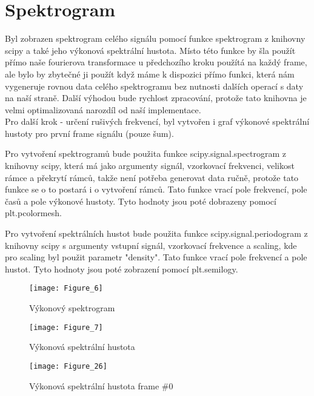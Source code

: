 \section{Spektrogram}

Byl zobrazen spektrogram celého signálu pomocí funkce spektrogram z knihovny scipy a také jeho výkonová spektrální hustota. Místo této funkce by šla použít přímo naše fourierova transformace u předchozího kroku použítá na každý frame, ale bylo by zbytečné ji použít když máme k dispozici přímo funkci, která nám vygeneruje rovnou data celého spektrogramu bez nutnosti dalších operací s daty na naší straně. Další výhodou bude rychlost zpracování, protože tato knihovna je velmi optimalizovaná narozdíl od naší implementace. \\
Pro další krok - určení rušivých frekvencí, byl vytvořen i graf výkonové spektrální hustoty pro první frame signálu (pouze šum).

Pro vytvoření spektrogramů bude použita funkce scipy.signal.spectrogram z knihovny scipy, která má jako argumenty signál, vzorkovací frekvenci, velikost rámce a překrytí rámců, takže není potřeba generovat data ručně, protože tato funkce se o to postará i o vytvoření rámců.
Tato funkce vrací pole frekvencí, pole časů a pole výkonové hustoty. Tyto hodnoty jsou poté dobrazeny pomocí plt.pcolormesh.

Pro vytvoření spektrálních hustot bude použita funkce scipy.signal.periodogram z knihovny scipy s argumenty vstupní signál, vzorkovací frekvence a scaling, kde pro scaling byl použit parametr "density".
Tato funkce vrací pole frekvencí a pole hustot.
Tyto hodnoty jsou poté zobrazení pomocí plt.semilogy.

\begin{figure}[H] 
	\centering
	\texttt{[image: Figure\_6]}
	\caption{Výkonový spektrogram}
\end{figure}

\begin{figure}[H] 
	\centering
	\texttt{[image: Figure\_7]}
	\caption{Výkonová spektrální hustota}
\end{figure}

\begin{figure}[H] 
	\centering
	\texttt{[image: Figure\_26]}
	\caption{Výkonová spektrální hustota frame \#0}
\end{figure}
